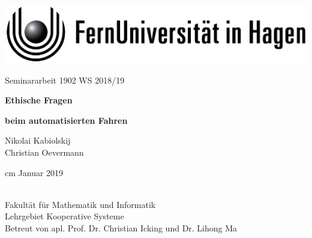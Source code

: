 \documentclass[twoside,a4paper,12pt]{article}
\begin{document}
\thispagestyle{empty}
\begin{center}
	\includegraphics[scale=1]{resources/fernunisignet-sw}
\end{center}
\vskip 4cm
\begin{center}
	{\Large Seminararbeit 1902 WS 2018/19\par}
	\vskip 2.5cm
	{\textbf{\Large Ethische Fragen} \par}    
	\vskip 0.2cm	
	{\textbf{\Large beim automatisierten Fahren} \par}    
	\vskip 1cm
	{\Large Nikolai Kabiolskij\\Christian Oevermann \par}
	 cm
	\Large Januar 2019
\end{center}
\FUiH\\
Fakultät für Mathematik und Informatik\\
Lehrgebiet Kooperative Systeme\\
Betreut von apl. Prof. Dr. Christian Icking und Dr. Lihong Ma\\
  
\newpage
\shipout\hbox{}
\newpage

\frontmatter
\end{document}
